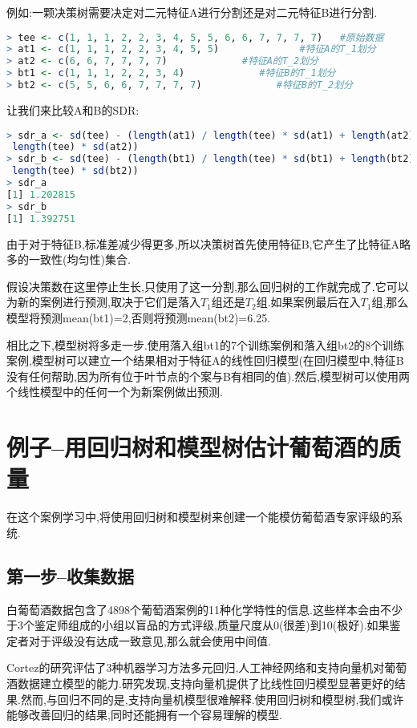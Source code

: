 \documentclass[11pt,a4paper,oneside]{book}
\begin{document}
例如:一颗决策树需要决定对二元特征A进行分割还是对二元特征B进行分割.
\begin{lstlisting}[language=r]
> tee <- c(1, 1, 1, 2, 2, 3, 4, 5, 5, 6, 6, 7, 7, 7, 7)   #原始数据
> at1 <- c(1, 1, 1, 2, 2, 3, 4, 5, 5)              #特征A的T_1划分
> at2 <- c(6, 6, 7, 7, 7, 7)             #特征A的T_2划分
> bt1 <- c(1, 1, 1, 2, 2, 3, 4)             #特征B的T_1划分
> bt2 <- c(5, 5, 6, 6, 7, 7, 7, 7)             #特征B的T_2划分
\end{lstlisting}
让我们来比较A和B的SDR:
\begin{lstlisting}[language=r]
> sdr_a <- sd(tee) - (length(at1) / length(tee) * sd(at1) + length(at2) /
 length(tee) * sd(at2))
> sdr_b <- sd(tee) - (length(bt1) / length(tee) * sd(bt1) + length(bt2) /
 length(tee) * sd(bt2))
> sdr_a
[1] 1.202815
> sdr_b
[1] 1.392751
\end{lstlisting}
由于对于特征B,标准差减少得更多,所以决策树首先使用特征B,它产生了比特征A略多的一致性(均匀性)集合.

假设决策数在这里停止生长,只使用了这一分割,那么回归树的工作就完成了.它可以为新的案例进行预测,取决于它们是落入$T_1$组还是$T_2$组.如果案例最后在入$T_1$组,那么模型将预测mean(bt1)=2,否则将预测mean(bt2)=6.25.

相比之下,模型树将多走一步.使用落入组bt1的7个训练案例和落入组bt2的8个训练案例,模型树可以建立一个结果相对于特征A的线性回归模型(在回归模型中,特征B没有任何帮助,因为所有位于叶节点的个案与B有相同的值).然后,模型树可以使用两个线性模型中的任何一个为新案例做出预测.

\section{例子--用回归树和模型树估计葡萄酒的质量}

在这个案例学习中,将使用回归树和模型树来创建一个能模仿葡萄酒专家评级的系统.

\subsection{第一步--收集数据}
白葡萄酒数据包含了4898个葡萄酒案例的11种化学特性的信息.这些样本会由不少于3个鉴定师组成的小组以盲品的方式评级,质量尺度从0(很差)到10(极好).如果鉴定者对于评级没有达成一致意见,那么就会使用中间值.

Cortez的研究评估了3种机器学习方法多元回归,人工神经网络和支持向量机对葡萄酒数据建立模型的能力.研究发现,支持向量机提供了比线性回归模型显著更好的结果.然而,与回归不同的是,支持向量机模型很难解释.使用回归树和模型树,我们或许能够改善回归的结果,同时还能拥有一个容易理解的模型.
\end{document}
